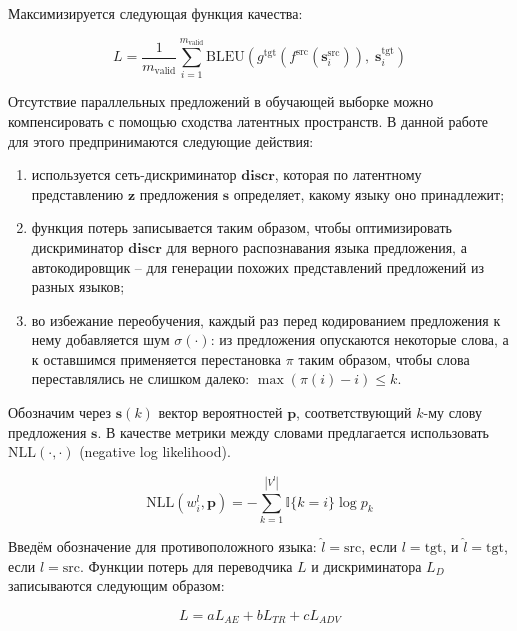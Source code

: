 \documentclass[12pt,twoside]{article}
\begin{document}
 Максимизируется следующая функция качества:

\[ L = \frac{1}{m_\text{valid}} \sum_{i=1}^{m_\text{valid}} \text{BLEU}(g^{\text{tgt}}(f^{\text{src}}(\mathbf{s}_{i}^{\text{src}})), \; \mathbf{s}_{i}^{\text{tgt}})\]

Отсутствие параллельных предложений в обучающей выборке можно компенсировать с помощью сходства латентных пространств. В данной работе для этого предпринимаются следующие действия:
\begin{enumerate}
	\item 
	используется сеть-дискриминатор $\mathbf{discr}$, которая по латентному представлению $\mathbf{z}$ предложения $\mathbf{s}$ определяет, какому языку оно принадлежит;
	\item
	функция потерь записывается таким образом, чтобы оптимизировать дискриминатор $\mathbf{discr}$ для верного распознавания языка предложения, а автокодировщик -- для генерации похожих представлений предложений из разных языков;
	\item 
	во избежание переобучения, каждый раз перед кодированием предложения к нему добавляется шум $\sigma(\cdot)$: из предложения опускаются некоторые слова, а к оставшимся применяется перестановка $\pi$ таким образом, чтобы слова переставлялись не слишком далеко: $\max (\pi(i)-i) \le k$. 
\end{enumerate}
 
 Обозначим через $\mathbf{s}(k)$ вектор вероятностей $\mathbf{p}$, соответствующий $k$-му слову предложения $\mathbf{s}$. В качестве метрики между словами предлагается использовать $\text{NLL}(\cdot, \cdot)$ (negative log likelihood).
 
 \[ \text{NLL}(w_i^l, \mathbf{p}) = -\sum_{k=1}^{|V^{l}|} \mathbb{I}\{k = i\} \log p_k\]
 
 Введём обозначение для противоположного языка: $\widehat{l} = \text{src}$, если $l = \text{tgt}$, и $\widehat{l} = \text{tgt}$, если $l = \text{src}$. Функции потерь для переводчика $L$ и дискриминатора $L_{D}$ записываются следующим образом:
 
 \[ L = aL_{AE} + bL_{TR} + cL_{ADV} \]
 
\end{document}
